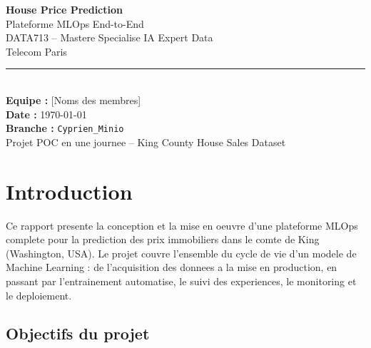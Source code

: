 \documentclass[a4paper,11pt]{article}
\begin{document}
\begin{titlepage}
\centering
\vspace*{2cm}

{\Huge\bfseries\textcolor{primary}{House Price Prediction}}\\[0.5cm]
{\LARGE\textcolor{secondary}{Plateforme MLOps End-to-End}}\\[2cm]

{\Large DATA713 -- Mastere Specialise IA Expert Data}\\[0.3cm]
{\Large Telecom Paris}\\[2cm]

\rule{0.6\textwidth}{0.4pt}\\[1.5cm]

{\large\textbf{Equipe :} [Noms des membres]}\\[0.5cm]
{\large\textbf{Date :} \today}\\[0.5cm]
{\large\textbf{Branche :} \texttt{Cyprien\_Minio}}\\[2cm]

\vfill
{\small Projet POC en une journee -- King County House Sales Dataset}
\end{titlepage}

\tableofcontents
\newpage

\section{Introduction}

Ce rapport presente la conception et la mise en oeuvre d'une plateforme MLOps complete
pour la prediction des prix immobiliers dans le comte de King (Washington, USA).
Le projet couvre l'ensemble du cycle de vie d'un modele de Machine Learning :
de l'acquisition des donnees a la mise en production, en passant par l'entrainement
automatise, le suivi des experiences, le monitoring et le deploiement.

\subsection{Objectifs du projet}
\end{document}
